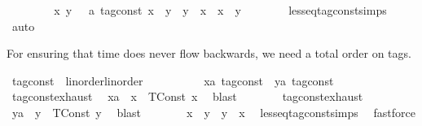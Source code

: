 \begin{isabellebody}
\ \ \isamarkupfalse%
\isanewline
\ \ \ \ \isamarkupfalse%
\ {\isacartoucheopen}{\isasymAnd}x\ y\ \ {\isacharcolon}{\isacharcolon}\ {\isacharprime}a\ tag{\isacharunderscore}const{\isachardot}\ x\ {\isasymle}\ y\ {\isasymLongrightarrow}\ y\ {\isasymle}\ x\ {\isasymLongrightarrow}\ x\ {\isacharequal}\ y{\isacartoucheclose}\isanewline
\ \ \ \ \ \ \isamarkupfalse%
\ less{\isacharunderscore}eq{\isacharunderscore}tag{\isacharunderscore}const{\isachardot}simps\ \isamarkupfalse%
\ auto\isanewline
\ \ \isamarkupfalse%
%
\endisatagproof
{\isafoldproof}%
%
\isadelimproof
%
\endisadelimproof
\isanewline
\isanewline
{}\isamarkupfalse%
%
\begin{isamarkuptext}%
For ensuring that time does never flow backwards, we need a total order on tags.%
\end{isamarkuptext}\isamarkuptrue%
\isamarkupfalse%
\ tag{\isacharunderscore}const\ {\isacharcolon}{\isacharcolon}\ {\isacharparenleft}linorder{\isacharparenright}linorder\isanewline
{}\isanewline
\ \ \isamarkupfalse%
%
\isadelimproof
\ %
\endisadelimproof
%
\isatagproof
{}\isamarkupfalse%
\isanewline
\ \ \ \ \isamarkupfalse%
\ x{\isacharcolon}{\isacharcolon}{\isacartoucheopen}{\isacharprime}a\ tag{\isacharunderscore}const{\isacartoucheclose}\ \ y{\isacharcolon}{\isacharcolon}{\isacartoucheopen}{\isacharprime}a\ tag{\isacharunderscore}const{\isacartoucheclose}\isanewline
\ \ \ \ \isamarkupfalse%
\ tag{\isacharunderscore}const{\isachardot}exhaust\ \isamarkupfalse%
\ xa\ \ {\isacartoucheopen}x\ {\isacharequal}\ TConst\ x\ \isamarkupfalse%
\ blast\isanewline
\ \ \ \ \isamarkupfalse%
\ \isamarkupfalse%
\ tag{\isacharunderscore}const{\isachardot}exhaust\ \isamarkupfalse%
\ ya\ \ {\isacartoucheopen}y\ {\isacharequal}\ TConst\ y\ \isamarkupfalse%
\ blast\isanewline
\ \ \ \ \isamarkupfalse%
\ \isamarkupfalse%
\ {\isacartoucheopen}x\ {\isasymle}\ y\ {\isasymor}\ y\ {\isasymle}\ x{\isacartoucheclose}\ \isamarkupfalse%
\ less{\isacharunderscore}eq{\isacharunderscore}tag{\isacharunderscore}const{\isachardot}simps\ \isamarkupfalse%
\ fastforce\isanewline
\ \ \isamarkupfalse%
%
\endisatagproof
{\isafoldproof}%
%
\isadelimproof
%
\endisadelimproof
\isanewline
\isanewline
{}\isamarkupfalse%
\isanewline
%
\isadelimtheory
\isanewline
%
\endisadelimtheory
%
\isatagtheory
{}\isamarkupfalse%
%
\endisatagtheory
{\isafoldtheory}%
%
\isadelimtheory
%
\endisadelimtheory
%
\end{isabellebody}%

